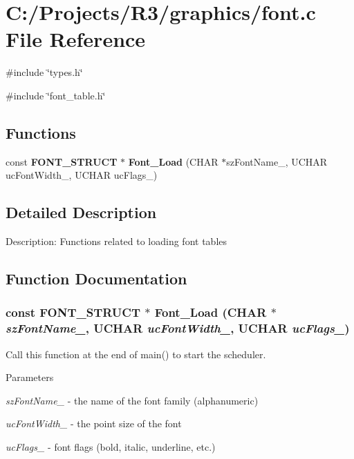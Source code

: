 \section{C:/Projects/R3/graphics/font.c File Reference}
\label{font_8c}
{\ttfamily \#include \char`\"{}types.h\char`\"{}}\par
{\ttfamily \#include \char`\"{}font\_\-table.h\char`\"{}}\par
\subsection*{Functions}
\begin{DoxyCompactItemize}
\item 
const {\bf FONT\_\-STRUCT} $\ast$ {\bf Font\_\-Load} (CHAR $\ast$szFontName\_\-, UCHAR ucFontWidth\_\-, UCHAR ucFlags\_\-)
\end{DoxyCompactItemize}


\subsection{Detailed Description}
Description: Functions related to loading font tables 

\subsection{Function Documentation}
\subsubsection[{Font\_\-Load}]{\setlength{\rightskip}{0pt plus 5cm}const {\bf FONT\_\-STRUCT} $\ast$ Font\_\-Load (CHAR $\ast$ {\em szFontName\_\-}, \/  UCHAR {\em ucFontWidth\_\-}, \/  UCHAR {\em ucFlags\_\-})}\label{font_8c_a2aaaa5b262a5a6f31d41fd57e0a9d353}
Call this function at the end of main() to start the scheduler.


\begin{DoxyParams}{Parameters}
\item[{\em szFontName\_\-}]-\/ the name of the font family (alphanumeric) \item[{\em ucFontWidth\_\-}]-\/ the point size of the font \item[{\em ucFlags\_\-}]-\/ font flags (bold, italic, underline, etc.) \end{DoxyParams}
